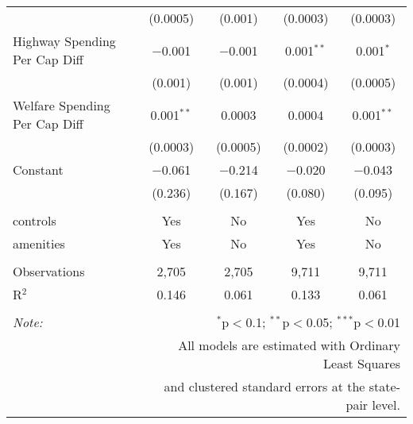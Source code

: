 \begin{table}[!htbp]
\begin{tabular}{@{\extracolsep{5pt}}lcccc}
  & (0.0005) & (0.001) & (0.0003) & (0.0003) \\ 
  Highway Spending Per Cap Diff & $-$0.001 & $-$0.001 & 0.001$^{**}$ & 0.001$^{*}$ \\ 
  & (0.001) & (0.001) & (0.0004) & (0.0005) \\ 
  Welfare Spending Per Cap Diff & 0.001$^{**}$ & 0.0003 & 0.0004 & 0.001$^{**}$ \\ 
  & (0.0003) & (0.0005) & (0.0002) & (0.0003) \\ 
  Constant & $-$0.061 & $-$0.214 & $-$0.020 & $-$0.043 \\ 
  & (0.236) & (0.167) & (0.080) & (0.095) \\ 
 \hline \\[-1.8ex] 
controls & Yes & No & Yes & No \\ 
amenities & Yes & No & Yes & No \\ 
\hline \\[-1.8ex] 
Observations & 2,705 & 2,705 & 9,711 & 9,711 \\ 
R$^{2}$ & 0.146 & 0.061 & 0.133 & 0.061 \\ 
\hline 
\hline \\[-1.8ex] 
\textit{Note:}  & \multicolumn{4}{r}{$^{*}$p$<$0.1; $^{**}$p$<$0.05; $^{***}$p$<$0.01} \\ 
 & \multicolumn{4}{r}{All models are estimated with Ordinary Least Squares} \\ 
 & \multicolumn{4}{r}{and clustered standard errors at the state-pair level.} \\ 
\end{tabular} 
\end{table} 
